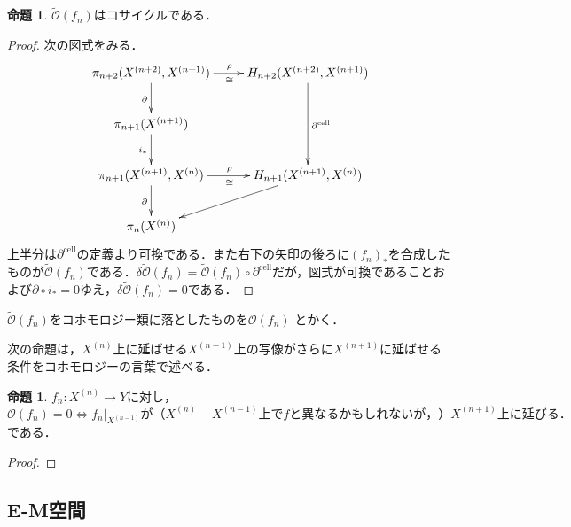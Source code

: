 \documentclass[a4paper,11pt]{jsarticle}
\theoremstyle{definition}
\newtheorem{prop}[thm]{命題}
\begin{document}
\begin{prop}
  $\tilde{\mathcal{O}}(f_n)$はコサイクルである．
\end{prop}
\begin{proof}
  次の図式をみる．
  \[\xymatrix{\pi_{n+2}(X^{(n+2)},X^{(n+1)})\ar[r]^{\rho}_\cong\ar[d]_\partial& H_{n+2}(X^{(n+2)},X^{(n+1)})\ar[dd]^{\partial^\mathrm{cell}}\\
  \pi_{n+1}(X^{(n+1)})\ar[d]_{i_*}&\\
  \pi_{n+1}(X^{(n+1)},X^{(n)})\ar[r]^\rho_\cong\ar[d]_\partial&H_{n+1}(X^{(n+1)},X^{(n)})\ar[ld]\\
  \pi_n(X^{(n)})&}
  \]
  上半分は$\partial^\mathrm{cell}$の定義より可換である．また右下の矢印の後ろに$(f_n)_*$を合成したものが$\tilde{\mathcal O}(f_n)$である．$\delta \tilde{\mathcal O}(f_n)=\tilde{\mathcal{O}}(f_n)\circ\partial^\mathrm{cell}$だが，図式が可換であることおよび$\partial\circ i_*=0$ゆえ，$\delta\tilde{\mathcal O}(f_n)=0$である．
\end{proof}
$\tilde{\mathcal{O}}(f_n)$をコホモロジー類に落としたものを$\mathcal{O}(f_n)$
とかく．

次の命題は，$X^{(n)}$上に延ばせる$X^{(n-1)}$上の写像がさらに$X^{(n+1)}$に延ばせる条件をコホモロジーの言葉で述べる．
\begin{prop}
  $f_n\colon X^{(n)}\to Y$に対し，\[
    \mathcal{O}(f_n)=0\Leftrightarrow f_n|_{X^{(n-1)}}が（X^{(n)}-X^{(n-1)}上でfと異なるかもしれないが，）X^{(n+1)}上に延びる．
  \]である．
\end{prop}
\begin{proof}
  
\end{proof}
\subsection{E-M空間}




\printindex
\end{document}
